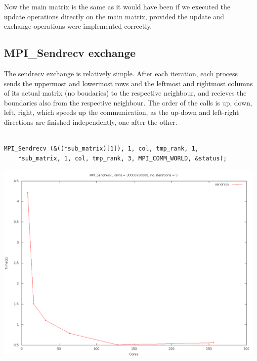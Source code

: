 \documentclass[11pt]{article}
\begin{document}
Now the main matrix is the same as it would have been if we executed the update operations directly on the main matrix, provided the update and exchange operations were implemented correctly.\\

\subsection{MPI\_Sendrecv exchange}
The sendrecv exchange is relatively simple. After each iteration, each process sends the uppermost and lowermost rows and the leftmost and rightmost columns
of its actual matrix (no boudaries) to the respective neighbour, and recieves the boundaries also from the respective neighbour. The order of the calls is
up, down, left, right, which speeds up the communication, as the up-down and left-right directions are finished independently, one after the other.\\
\begin{lstlisting}[label=some-code, caption=MPI\_Sendrecv left side call]

MPI_Sendrecv (&((*sub_matrix)[1]), 1, col, tmp_rank, 1,
    *sub_matrix, 1, col, tmp_rank, 3, MPI_COMM_WORLD, &status);

\end{lstlisting}
\includegraphics[width=\textwidth]{srcxt.png}
\end{document}
